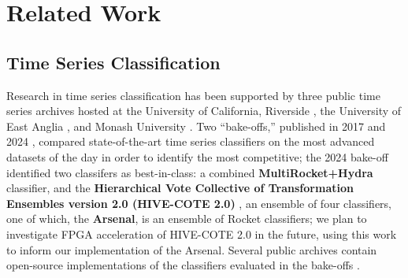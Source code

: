 \section{Related Work}
\label{sec:Related}

\subsection{Time Series Classification}
\label{sec:TSC}

Research in time series classification has been supported by three public time series archives hosted at the University of California, Riverside \cite{UCRTimeSeries}, the University of East Anglia \cite{UEATimeSeries}, and Monash University \cite{MONSTER}. %
Two ``bake-offs,'' published in 2017 and 2024 \cite{BakeOff, BakeOffRedux, BakeOffReduxCorrection}, compared state-of-the-art time series classifiers on the most advanced datasets of the day in order to identify the most competitive; the 2024 bake-off identified two classifers as best-in-class: a combined \textbf{MultiRocket+Hydra} classifier, and the \textbf{Hierarchical Vote Collective of Transformation Ensembles version 2.0 (HIVE-COTE 2.0)} \cite{HIVE-COTE2.0}, an ensemble of four classifiers, one of which, the \textbf{Arsenal}, is an ensemble of Rocket classifiers; we plan to investigate FPGA acceleration of HIVE-COTE 2.0 in the future, using this work to inform our implementation of the Arsenal. Several public archives contain open-source implementations of the classifiers evaluated in the bake-offs \cite{sktime, pyts, tslearn, aeon-arxiv, aeon-pkdd}. %



